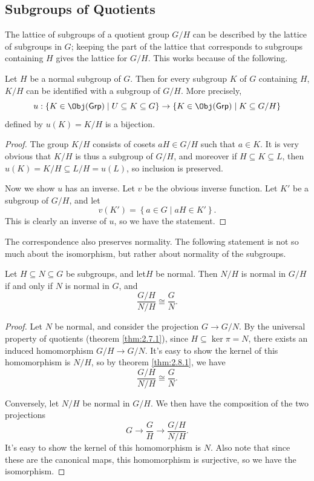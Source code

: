 \subsection{Subgroups of Quotients}
The lattice of subgroups of a quotient group  $G /H$ can be described by the lattice of subgroups in $G$; keeping the part of the lattice that corresponds to subgroups containing $H$ gives the lattice for $G /H$. This works because of the following.
\begin{proposition}\label{prp:2.8.2}
	Let $H$ be a normal subgroup of $G$. Then for every subgroup $K$ of $G$ containing $H$, $K /H$ can be identified with a subgroup of $G /H$. More precisely,
	\[
		u : \left\{ K\in \Obj(\mathsf{ Grp })  \mid U\subseteq K\subseteq G \right\}  \to \left\{ K\in \Obj(\mathsf{ Grp })  \mid K\subseteq G /H \right\} 
	\]
	defined by $u(K)=K /H$ is a bijection.
\end{proposition}
\begin{proof}
	The group $K /H$ consists of cosets $aH\in G /H$ such that $a\in K$. It is very obvious that $K /H$ is thus a subgroup of $G /H$, and moreover if $H\subseteq K\subseteq L$, then $u(K)=K /H \subseteq L /H=u(L)$, so inclusion is preserved.

	Now we show $u$ has an inverse. Let $v$ be the obvious inverse function. Let $K'$ be a subgroup of $G /H$, and let
	\[
		v(K')=\left\{ a\in G \mid aH\in K' \right\} 
	.\]
	This is clearly an inverse of $u$, so we have the statement.
\end{proof}
The correspondence also preserves normality. The following statement is not so much about the isomorphism, but rather about normality of the subgroups.
\begin{proposition}\label{prp:2.8.3}
	Let $H\subseteq N\subseteq G$ be subgroups, and let$H$ be normal. Then $N /H$ is normal in $G /H$ if and only if $N$ is normal in $G$, and
	\[
		\frac{G /H}{N /H}\cong \frac{G}{N}
	.\]
\end{proposition}
\begin{proof}
	Let $N$ be normal, and consider the projection $G \to G /N$. By the universal property of quotients (theorem \ref{thm:2.7.1}), since $H\subseteq \ker \pi =N$, there exists an induced homomorphism $G /H \to G /N$. It's easy to show the kernel of this homomorphism is $N /H$, so by theorem \ref{thm:2.8.1}, we have
	\[
		\frac{G /H}{N /H}\cong \frac{G}{N}
	.\]
	
	Conversely, let $N /H$ be normal in $G /H$. We then have the composition of the two projections
	\[
		G \to \frac{G}{H} \to \frac{G /H}{N /H}
	.\]
	It's easy to show the kernel of this homomorphism is $N$. Also note that since these are the canonical maps, this homomorphism is surjective, so we have the isomorphism.
\end{proof}

